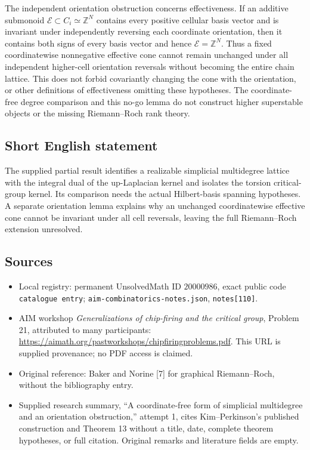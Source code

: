 \documentclass[11pt]{article}
\newcommand{\Z}{\mathbb{Z}}
\begin{document}
The independent orientation obstruction concerns effectiveness. If an additive submonoid \(\mathcal E\subset C_i\simeq\Z^N\) contains every positive cellular basis vector and is invariant under independently reversing each coordinate orientation, then it contains both signs of every basis vector and hence \(\mathcal E=\Z^N\). Thus a fixed coordinatewise nonnegative effective cone cannot remain unchanged under all independent higher-cell orientation reversals without becoming the entire chain lattice. This does not forbid covariantly changing the cone with the orientation, or other definitions of effectiveness omitting these hypotheses. The coordinate-free degree comparison and this no-go lemma do not construct higher superstable objects or the missing Riemann--Roch rank theory.
\subsection{Short English statement}
The supplied partial result identifies a realizable simplicial multidegree lattice with the integral dual of the up-Laplacian kernel and isolates the torsion critical-group kernel. Its comparison needs the actual Hilbert-basis spanning hypotheses. A separate orientation lemma explains why an unchanged coordinatewise effective cone cannot be invariant under all cell reversals, leaving the full Riemann--Roch extension unresolved.
\subsection{Sources}
\begin{itemize}
\item Local registry: permanent UnsolvedMath ID \(20000986\), exact public code \texttt{catalogue entry}; \texttt{aim-combinatorics-notes.json}, \texttt{notes[110]}.
\item AIM workshop \emph{Generalizations of chip-firing and the critical group}, Problem 21, attributed to many participants: \url{https://aimath.org/pastworkshops/chipfiringproblems.pdf}. This URL is supplied provenance; no PDF access is claimed.
\item Original reference: Baker and Norine [7] for graphical Riemann--Roch, without the bibliography entry.
\item Supplied research summary, ``A coordinate-free form of simplicial multidegree and an orientation obstruction,'' attempt 1, cites Kim--Perkinson's published construction and Theorem 13 without a title, date, complete theorem hypotheses, or full citation. Original remarks and literature fields are empty.
\end{itemize}
\end{document}
